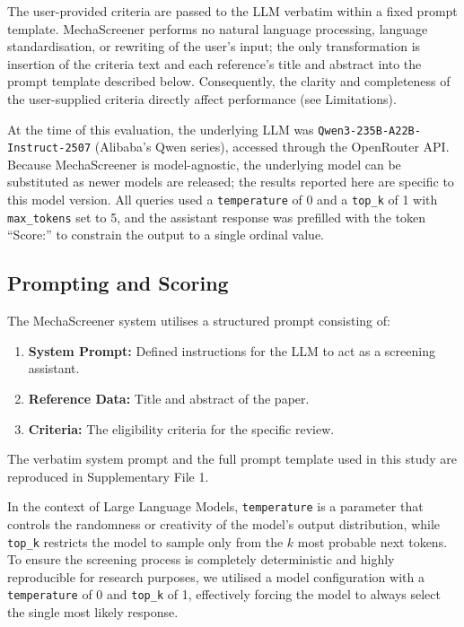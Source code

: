\documentclass[11pt,a4paper]{article}
\begin{document}
The user-provided criteria are passed to the LLM verbatim within a fixed prompt template. MechaScreener performs no natural language processing, language standardisation, or rewriting of the user's input; the only transformation is insertion of the criteria text and each reference's title and abstract into the prompt template described below. Consequently, the clarity and completeness of the user-supplied criteria directly affect performance (see Limitations).

At the time of this evaluation, the underlying LLM was \texttt{Qwen3-235B-A22B-Instruct-2507} (Alibaba's Qwen series), accessed through the OpenRouter API. Because MechaScreener is model-agnostic, the underlying model can be substituted as newer models are released; the results reported here are specific to this model version. All queries used a \texttt{temperature} of 0 and a \texttt{top\_k} of 1 with \texttt{max\_tokens} set to 5, and the assistant response was prefilled with the token ``Score:'' to constrain the output to a single ordinal value.

\subsection{Prompting and Scoring}
The MechaScreener system utilises a structured prompt consisting of:
\begin{enumerate}
    \item \textbf{System Prompt:} Defined instructions for the LLM to act as a screening assistant.
    \item \textbf{Reference Data:} Title and abstract of the paper.
    \item \textbf{Criteria:} The eligibility criteria for the specific review.
\end{enumerate}
The verbatim system prompt and the full prompt template used in this study are reproduced in Supplementary File 1.

In the context of Large Language Models, \texttt{temperature} is a parameter that controls the randomness or creativity of the model's output distribution, while \texttt{top\_k} restricts the model to sample only from the $k$ most probable next tokens. To ensure the screening process is completely deterministic and highly reproducible for research purposes, we utilised a model configuration with a \texttt{temperature} of 0 and \texttt{top\_k} of 1, effectively forcing the model to always select the single most likely response.
\end{document}
